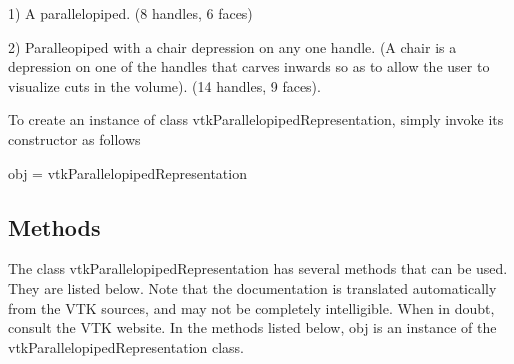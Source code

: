 1) A parallelopiped. (8 handles, 6 faces) 

2) Paralleopiped with a chair depression on any one handle. (A chair is a depression on one of the handles that carves inwards so as to allow the user to visualize cuts in the volume). (14 handles, 9 faces).

To create an instance of class vtk\-Parallelopiped\-Representation, simply invoke its constructor as follows \begin{DoxyVerb}  obj = vtkParallelopipedRepresentation
\end{DoxyVerb}
 \hypertarget{vtkwidgets_vtkxyplotwidget_Methods}{}\subsection{Methods}\label{vtkwidgets_vtkxyplotwidget_Methods}
The class vtk\-Parallelopiped\-Representation has several methods that can be used. They are listed below. Note that the documentation is translated automatically from the V\-T\-K sources, and may not be completely intelligible. When in doubt, consult the V\-T\-K website. In the methods listed below, {\ttfamily obj} is an instance of the vtk\-Parallelopiped\-Representation class. 
